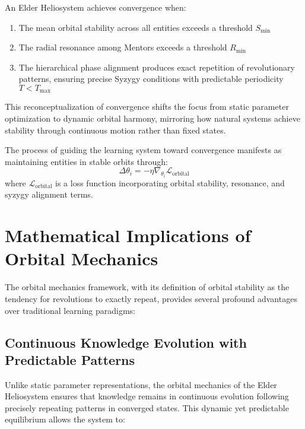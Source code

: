 \begin{theorem}
An Elder Heliosystem achieves convergence when:
\begin{enumerate}
    \item The mean orbital stability across all entities exceeds a threshold $S_{\text{min}}$
    \item The radial resonance among Mentors exceeds a threshold $R_{\text{min}}$
    \item The hierarchical phase alignment produces exact repetition of revolutionary patterns, ensuring precise Syzygy conditions with predictable periodicity $T < T_{\text{max}}$
\end{enumerate}
\end{theorem}

This reconceptualization of convergence shifts the focus from static parameter optimization to dynamic orbital harmony, mirroring how natural systems achieve stability through continuous motion rather than fixed states.

\begin{proposition}
The process of guiding the learning system toward convergence manifests as maintaining entities in stable orbits through:
\begin{equation}
\Delta\theta_i = -\eta \nabla_{\theta_i} \mathcal{L}_{\text{orbital}}
\end{equation}
where $\mathcal{L}_{\text{orbital}}$ is a loss function incorporating orbital stability, resonance, and syzygy alignment terms.
\end{proposition}

\section{Mathematical Implications of Orbital Mechanics}

The orbital mechanics framework, with its definition of orbital stability as the tendency for revolutions to exactly repeat, provides several profound advantages over traditional learning paradigms:

\subsection{Continuous Knowledge Evolution with Predictable Patterns}

Unlike static parameter representations, the orbital mechanics of the Elder Heliosystem ensures that knowledge remains in continuous evolution following precisely repeating patterns in converged states. This dynamic yet predictable equilibrium allows the system to:

